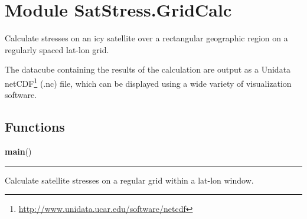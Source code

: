 %
%
%


\section{Module SatStress.GridCalc}

    \label{SatStress:GridCalc}
Calculate stresses on an icy satellite over a rectangular geographic region
on a regularly spaced lat-lon grid.

The datacube containing the results of the calculation are output as a 
Unidata 
netCDF\footnote{\href{http://www.unidata.ucar.edu/software/netcdf}{http://www.unidata.ucar.edu/software/netcdf}}
(.nc) file, which can be displayed using a wide variety of visualization 
software.



  \subsection{Functions}

    \label{SatStress:GridCalc:main}

    \vspace{0.5ex}

\hspace{.8\funcindent}\begin{boxedminipage}{\funcwidth}

    \raggedright \textbf{main}()

    \vspace{-1.5ex}

    \rule{\textwidth}{0.5\fboxrule}
\setlength{\parskip}{2ex}
    Calculate satellite stresses on a regular grid within a lat-lon window.

\setlength{\parskip}{1ex}
    \end{boxedminipage}


